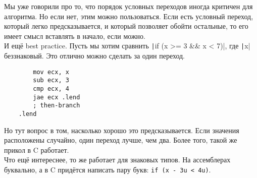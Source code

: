 \documentclass{article}
\begin{document}
    Мы уже говорили про то, что порядок условных переходов иногда критичен для алгоритма. Но если нет, этим можно пользоваться. Если есть условный переход, который легко предсказывается, и который позволяет обойти остальные, то его имеет смысл вставлять в начало, если можно.\\
    И ещё best practice. Пусть мы хотим сравнить \texttt|if (x >= 3 && x < 7)|, где \texttt|x| беззнаковый. Это отлично можно сделать за один переход.
    \begin{verbatim}
        mov ecx, x
        sub ecx, 3
        cmp ecx, 4
        jae ecx .lend
        ; then-branch
    .lend
    \end{verbatim}
    Но тут вопрос в том, насколько хорошо это предсказывается. Если значения расположены случайно, один переход лучше, чем два. Более того, такой же прикол в C работает.\\
    Что ещё интереснее, то же работает для знаковых типов. На ассемблерах буквально, а в C придётся написать пару букв: \Verb|if (x - 3u < 4u)|.
\end{document}
